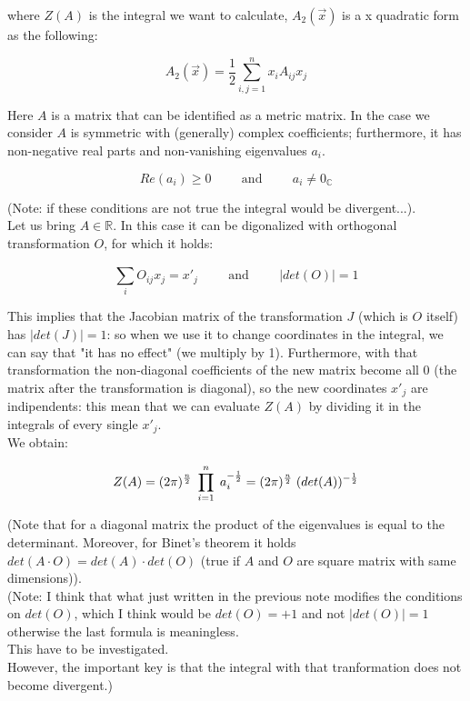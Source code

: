 \documentclass[12pt, english, a4paper]{book}
\begin{document}
where $Z(A)$ is the integral we want to calculate, $A_2(\vec{x})$ is a x quadratic form as the following:

\begin{equation}
A_2(\vec{x}) = \frac{1}{2} \sum\limits_{i,j = 1}^{n} x_i A_{ij} x_j
\end{equation}

Here $A$ is a matrix that can be identified as a metric matrix.
In the case we consider $A$ is symmetric with (generally) complex coefficients; furthermore, it has non-negative real parts and non-vanishing eigenvalues $a_i$.

$$ Re(a_i) \geq 0 \hspace{1cm} \mathrm{and} \hspace{1cm}  a_i \neq 0_{\mathbb{C}} $$

(Note: if these conditions are not true the integral would be divergent...).\\

Let us bring $A \in \mathbb{R}$. In this case it can be digonalized with orthogonal transformation $O$, for which it holds:

$$ \sum\limits_{i}^{} O_{ij} x_j = x'_j \hspace{1cm} \mathrm{and} \hspace{1cm} |det(O)| = 1 $$

This implies that the Jacobian matrix of the transformation $J$ (which is $O$ itself) has $|det(J)| = 1$: so when we use it to change coordinates in the integral, we can say that "it has no effect" (we multiply by 1).
Furthermore, with that transformation the non-diagonal coefficients of the new matrix become all 0 (the matrix after the transformation is diagonal), so the new coordinates $x'_j$ are indipendents: this mean that we can evaluate $Z(A)$ by dividing it in the integrals of every single $x'_j$.\\
We obtain:

\begin{equation}\label{Gaussian integral result}
Z(A) = (2\pi)^{ \frac{n}{2} } \hspace{1mm} \prod\limits_{i=1}^{n} \hspace{1mm} a_i^{ -\frac{1}{2} } = (2\pi)^{ \frac{n}{2} } \hspace{1mm} (det(A))^{ -\frac{1}{2} }
\end{equation}

(Note that for a diagonal matrix the product of the eigenvalues is equal to the determinant. Moreover, for Binet's theorem it holds $det(A \cdot O) = det(A) \cdot det(O)$ (true if $A$ and $O$ are square matrix with same dimensions)).\\
(Note: I think that what just written in the previous note modifies the conditions on $det(O)$, which I think would be $det(O) = +1$ and not $|det(O)| = 1 $ otherwise the last formula is meaningless.\\
This have to be investigated.\\
However, the important key is that the integral with that tranformation does not become divergent.)\\
\end{document}
